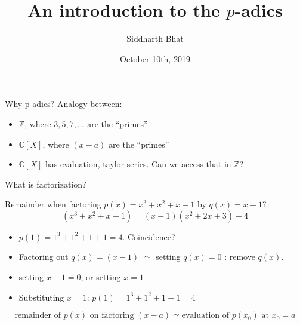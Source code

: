 \documentclass[8pt]{beamer}
\author{Siddharth Bhat}
\date{October 10th, 2019}
\institute{IIIT Theory group \\ Seminar Saturday}
\title{An introduction to the $p$-adics}
\newcommand{\Z}{\mathbb Z}
\newcommand{\C}{\mathbb C}
\begin{document}
\maketitle

\begin{frame}[label=sec-1]{Why p-adics?}
Analogy between:
\begin{itemize}
\item $\mathbb Z$, \pause where $3, 5, 7, \dots$ are the ``primes''\pause
\item $\C[X]$, \pause where $(x - a)$ are the ``primes''\pause
\item $\C[X]$ has evaluation, taylor series. Can we access that in $\Z$?
\end{itemize}
\end{frame}

\begin{frame}{What is factorization?}

Remainder when factoring $p(x) = x^3 + x^2 + x + 1$ by $q(x) = x - 1$? \pause
{}
\pause
$$(x^3+ x^2 + x + 1) = (x-1)(x^2 + 2x + 3) + 4$$
\pause
\begin{itemize}
\item $p(1) = 1^3 + 1^2 + 1 + 1 = 4$. Coincidence? \pause
\item Factoring out $q(x) = (x-1)$ \pause $ \simeq $ setting $q(x) = 0$ \pause : remove $q(x)$. \pause
\item setting $x - 1 = 0$, or setting $x = 1$ \pause
\item Substituting $x = 1$:  $p(1) = 1^3 + 1^2 + 1 + 1 = 4$ \pause
\end{itemize}

$$
\text{remainder of $p(x)$ on factoring $(x - a)$} \simeq \text{evaluation of $p(x_0)$ at $x_0 = a$}
$$
\end{frame}
\end{document}
